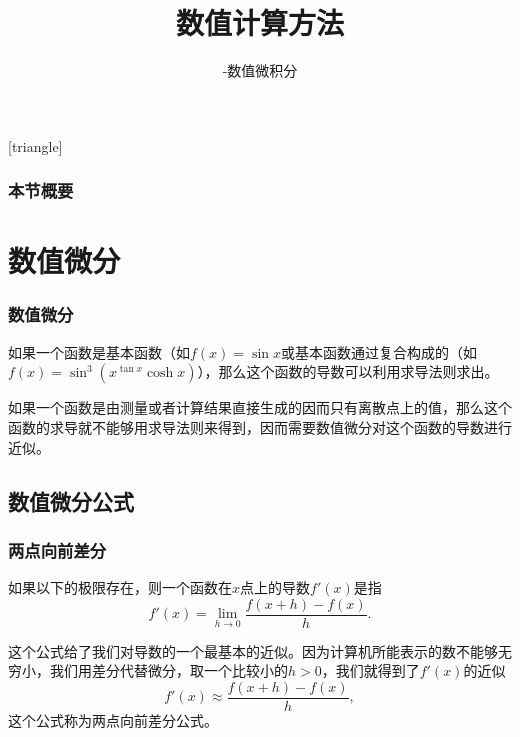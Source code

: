 \documentclass[10pt]{beamer}
\title[数值计算方法]{数值计算方法}
\subtitle{-数值微积分}
\begin{document}
[triangle]

\begin{frame}
\titlepage
\end{frame}


\begin{frame}
  \frametitle{本节概要}
  \tableofcontents%
\end{frame}


\section{数值微分}

\begin{frame}
\frametitle{数值微分}
如果一个函数是基本函数（如$f(x) = \sin x$或基本函数通过复合构成的（如$f(x) = \sin^3 ( x^{\tan x} \cosh x)$），那么这个函数的导数可以利用求导法则求出。

\vspace{0.2cm}

如果一个函数是由测量或者计算结果直接生成的因而只有离散点上的值，那么这个函数的求导就不能够用求导法则来得到，因而需要数值微分对这个函数的导数进行近似。
\end{frame}


\subsection{数值微分公式}

\begin{frame}
\frametitle{两点向前差分}
\begin{definition}[微分]
如果以下的极限存在，则一个函数在$x$点上的导数$f'(x)$是指
\begin{equation}
f'(x) = \lim_{h \rightarrow 0} \frac{f(x+h) - f(x)}{h}.
\end{equation}
\end{definition}
这个公式给了我们对导数的一个最基本的近似。因为计算机所能表示的数不能够无穷小，我们用差分代替微分，取一个比较小的$h>0$，我们就得到了$f'(x)$的近似
\begin{equation}
\label{eq: foward difference}
f'(x) \approx \frac{f(x+h) - f(x)}{h},
\end{equation}
这个公式称为两点向前差分公式。
\end{frame}
\end{document}

